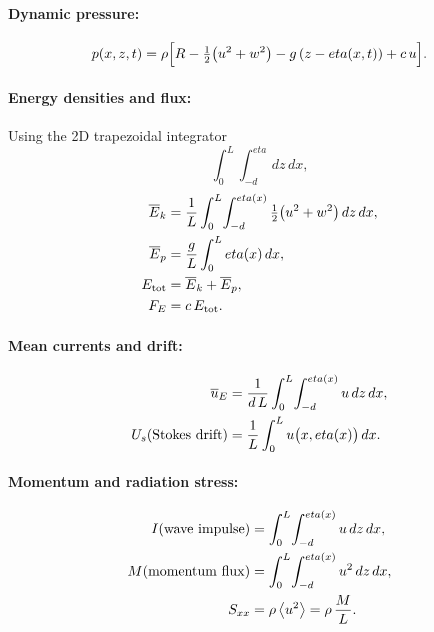 \documentclass[journal,10pt,twocolumn]{IEEEtran}
\def\eta{eta}%
\def\cdot{}%
\def\;{ }%
\begin{document}
    \paragraph{Dynamic pressure:}
    \begin{equation}
        p(x,z,t)
        = \rho\Bigl[R - \tfrac12\bigl(u^{2}+w^{2}\bigr) - g\,(z - \eta(x,t)) + c\,u\Bigr].
    \end{equation}

    \paragraph{Energy densities and flux:}
    Using the 2D trapezoidal integrator
    \[
        \int_{0}^{L}\!\int_{-d}^{\eta}\!\cdot\,dz\,dx,
    \]
    \begin{align}
        \overline{E}_{k}
        &= \frac{1}{L}\int_{0}^{L}\!\int_{-d}^{\eta(x)} \tfrac12\bigl(u^{2}+w^{2}\bigr)\,dz\,dx,
        \\
        \overline{E}_{p}
        &= \frac{g}{L}\int_{0}^{L} \eta(x)\,dx,
        \\
        E_{\rm tot}
        &= \overline{E}_{k} + \overline{E}_{p},
        \\
        F_{E}
        &= c\,E_{\rm tot}.
    \end{align}

    \paragraph{Mean currents and drift:}
    \begin{align}
        \overline{u}_{E}
        &= \frac{1}{d\,L}\int_{0}^{L}\!\int_{-d}^{\eta(x)} u\,dz\,dx,
        \\
        U_{s}\;({\rm Stokes\ drift})
        &= \frac{1}{L}\int_{0}^{L} u\bigl(x,\eta(x)\bigr)\,dx.
    \end{align}

    \paragraph{Momentum and radiation stress:}
    \begin{align}
        I\;({\rm wave\ impulse})
        &= \int_{0}^{L}\!\int_{-d}^{\eta(x)} u\,dz\,dx,
        \\
        M\;({\rm momentum\ flux})
        &= \int_{0}^{L}\!\int_{-d}^{\eta(x)} u^{2}\,dz\,dx,
        \\
        S_{xx}
        &= \rho\,\bigl\langle u^{2}\bigr\rangle
        = \rho\,\frac{M}{L}.
    \end{align}
\end{document}
